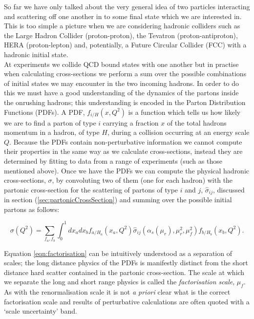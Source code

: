 	So far we have only talked about the very general idea of two particles interacting and scattering off one another in to
	some final state which we are interested in.  This is too simple a picture when we are considering hadronic colliders
	such as the Large Hadron Collider (proton-proton), the Tevatron (proton-antiproton), HERA (proton-lepton) and, potentially,
	a Future Circular Collider (FCC) with a hadronic initial state.\\At experiments we collide QCD bound states with one another
	but in practise when calculating cross-sections we perform a sum over the possible combinations of initial states we may
	encounter in the two incoming hadrons.  In order to do this we must have a good understanding of the dynamics of the partons
	inside the onrushing hadrons; this understanding is encoded in the Parton Distribution Functions (PDFs).  A PDF,
	$f_{i/H}(x, Q^2)$ is a function which tells us how likely we are to find a parton of type $i$ carrying a fraction $x$ of the
	total hadrons momentum in a hadron, of type $H$, during a collision occurring at an energy scale $Q$.  Because the PDFs contain
	non-perturbative information we cannot compute their properties in the same way as we calculate cross-sections, instead they
	are determined by fitting to data from a range of experiments (such as those mentioned above).  Once we have the
	PDFs we can compute the physical hadronic cross-sections, $\sigma$, by convoluting two of them (one for each hadron) with
	the partonic cross-section for the scattering of partons of type $i$ and $j$, $\hat{\sigma}_{ij}$, discussed in section
	(\ref{sec:partonicCrossSection}) and summing over the possible initial partons as follows:

	\begin{equation}
		\sigma(Q^2) = \sum_{f_a,f_b}\int_0^1dx_adx_bf_{a/H_a}(x_a, Q^2)\hat{\sigma}_{ij}(\alpha_s(\mu_r), \mu_r^2, \mu_f^2)f_{b/H_b}(x_b, Q^2).
		\label{eqn:factorisation}
	\end{equation}

	Equation \eqref{eqn:factorisation} can be intuitively understood as a separation of scales; the long distance physics of the PDFs is
	manifestly distinct from the short distance hard scatter contained in the partonic cross-section.  The scale at which we separate the
	long and short range physics is called the \emph{factorisation scale}, $\mu_f$.  As with the renormalisation scale it is not
	\emph{a priori} clear what is the correct factorisation scale and results of perturbative calculations are often quoted with
	a `scale uncertainty' band.

